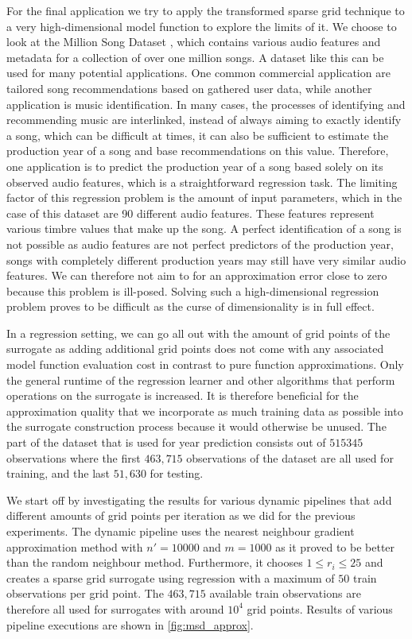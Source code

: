 \documentclass[
  a4paper,  %
  twoside,  %
  bibliography=totoc,
  headsepline,
  cleardoublepage=empty,
  parskip=half,
  draft=false
]{scrbook}
\begin{document}
For the final application we try to apply the transformed sparse grid technique to a very high-dimensional model function to explore the limits of it.
We choose to look at the Million Song Dataset \cite{BertinMahieux2011}, which contains various audio features and metadata for a collection of over one million songs.
A dataset like this can be used for many potential applications.
One common commercial application are tailored song recommendations based on gathered user data, while another application is music identification.
In many cases, the processes of identifying and recommending music are interlinked, \ie instead of always aiming to exactly identify a song, which can be difficult at times, it can also be sufficient to estimate the production year of a song and base recommendations on this value.
Therefore, one application is to predict the production year of a song based solely on its observed audio features, which is a straightforward regression task.
The limiting factor of this regression problem is the amount of input parameters, which in the case of this dataset are 90 different audio features.
These features represent various timbre values that make up the song.
A perfect identification of a song is not possible as audio features are not perfect predictors of the production year, \ie songs with completely different production years may still have very similar audio features.
We can therefore not aim to for an approximation error close to zero because this problem is ill-posed.
Solving such a high-dimensional regression problem proves to be difficult as the curse of dimensionality is in full effect.

In a regression setting, we can go all out with the amount of grid points of the surrogate as adding additional grid points does not come with any associated model function evaluation cost in contrast to pure function approximations.
Only the general runtime of the regression learner and other algorithms that perform operations on the surrogate is increased.
It is therefore beneficial for the approximation quality that we incorporate as much training data as possible into the surrogate construction process because it would otherwise be unused.
The part of the dataset that is used for year prediction consists out of $515345$ observations where the first $463,715$ observations of the dataset are all used for training, and the last $51,630$ for testing.

We start off by investigating the results for various dynamic pipelines that add different amounts of grid points per iteration as we did for the previous experiments.
The dynamic pipeline uses the nearest neighbour gradient approximation method with $n'=10000$ and $m=1000$ as it proved to be better than the random neighbour method.
Furthermore, it chooses $1 \leq r_i \leq 25$ and creates a sparse grid surrogate using regression with a maximum of $50$ train observations per grid point.
The $463,715$ available train observations are therefore all used for surrogates with around $10^4$ grid points.
Results of various pipeline executions are shown in \cref{fig:msd_approx}.
\end{document}
